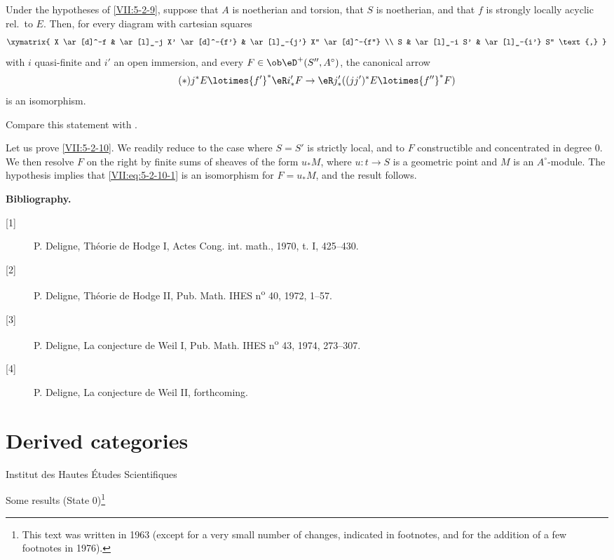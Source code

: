 \begin{proposition}\label{VII:5-2-10}
Under the hypotheses of \ref{VII:5-2-9}, suppose that $A$ is noetherian and
torsion, that $S$ is noetherian, and that $f$ is strongly locally acyclic
rel.\ to $E$. Then, for every diagram with cartesian squares
\[\xymatrix{
  X \ar[d]^-f 
    & \ar[l]_-j X' \ar[d]^-{f'} 
    & \ar[l]_-{j'} X'' \ar[d]^-{f''} \\
  S 
    & \ar[l]_-i S' 
    & \ar[l]_-{i'} S'' \text{,} 
}\]
with $i$ quasi-finite and $i'$ an open immersion, and every
$F\in\ob\eD^+(S'',A^\circ)$, the canonical arrow
\begin{equation*}\tag{$*$}\label{VII:eq:5-2-10-1}
  j^\ast E \lotimes {f'}^\ast \eR i'_\ast F \to \eR j'_\ast ((j j')^\ast E\lotimes {f''}^\ast F) 
\end{equation*}
is an isomorphism.
\end{proposition}

Compare this statement with .

Let us prove \ref{VII:5-2-10}. We readily reduce to the case where $S=S'$ is
strictly local, and to $F$ constructible and concentrated in degree $0$. We then
resolve $F$ on the right by finite sums of sheaves of the form $u_\ast M$,
where $u:t\to S$ is a geometric point and $M$ is an $A^\circ$-module. The
hypothesis implies that
\eqref{VII:eq:5-2-10-1} is an isomorphism for $F=u_\ast M$, and the result
follows.


\begin{center}\textbf{Bibliography.}\end{center}
\begin{description}
\item[{[1]}] P. Deligne, Théorie de Hodge I, Actes Cong. int. math., 1970, t. I, 425--430.
\item[{[2]}] P. Deligne, Théorie de Hodge II, Pub. Math. IHES n\textsuperscript{o} 40, 1972, 1--57.
\item[{[3]}] P. Deligne, La conjecture de Weil I, Pub. Math. IHES n\textsuperscript{o} 43, 1974, 273--307.
\item[{[4]}] P. Deligne, La conjecture de Weil II, forthcoming.
\end{description}



\chapter{Derived categories}\label{VIII}
\begin{center}Institut des Hautes Études Scientifiques\end{center}
Some results (State 0)\footnote{This text was written in 1963 (except for a very small number of changes, indicated in footnotes, and for the addition of a few footnotes in 1976).}


